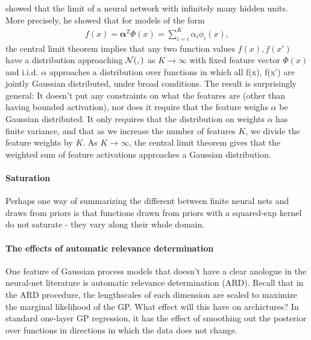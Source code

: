 \documentclass{article}
\begin{document}
\cite{neal1995bayesian} showed that the limit of a neural network with infinitely many hidden units. More precisely, he showed that for models of the form
%
\begin{align}
f(x) = {\mathbf \alpha}^T \Phi(x) = \sum_{i=i}^K \alpha_i \phi_i(x),
\end{align}
%
the central limit theorem implies that any two function values $f(x), f(x')$ have a distribution approaching $\mathcal{N}\!\left(,\right)$ as $K \rightarrow \infty$ with fixed feature vector $\Phi(x)$ and i.i.d. $\alpha$ approaches a distribution over functions in which all f(x), f(x') are jointly Gaussian distributed, under broad conditions. The result is surprisingly general:  It doesn't put any constraints on what the features are (other than having bounded activation), nor does it require that the feature weighs $\alpha$ be Gaussian distributed.  It only requires that the distribution on weights $\alpha$ has finite variance, and that as we increase the number of features $K$, we divide the feature weights by $K$.  As $K \rightarrow \infty$, the central limit theorem gives that the weighted sum of feature activations approaches a Gaussian distribution.

\paragraph{Saturation} Perhaps one way of summarizing the different between finite neural nets and draws from \gp{} priors is that functions drawn from \gp{} priors with a squared-exp kernel do not saturate - they vary along their whole domain.

\paragraph{The effects of automatic relevance determination}  One feature of Gaussian process models that doesn't have a clear anologue in the neural-net literature is automatic relevance determination (ARD).  Recall that in the ARD procedure, the lengthscales of each dimension are scaled to maximize the marginal likelihood of the GP.  What effect will this have on archictures?  In standard one-layer GP regression, it has the effect of smoothing out the posterior over functions in directions in which the data does not change.
\end{document}
